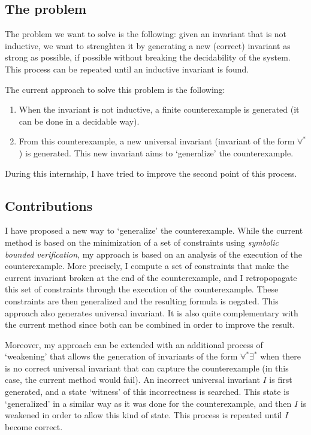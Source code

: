 \documentclass{article}
\newenvironment{point}[1]%
{\subsection*{#1}}%
{}
\begin{document}
\begin{point}{The problem}
  
  The problem we want to solve is the following:
  given an invariant that is not inductive, we want to strenghten it by generating a new (correct) invariant as strong as possible,
  if possible without breaking the decidability of the system.
  This process can be repeated until an inductive invariant is found.

  The current approach to solve this problem is the following:
  \begin{enumerate}
    \item When the invariant is not inductive, a finite counterexample is generated (it can be done in a decidable way).
    \item From this counterexample, a new universal invariant (invariant of the form \(\forall^*\)) is generated. This new invariant aims to `generalize' the counterexample.
  \end{enumerate}
  
  During this internship, I have tried to improve the second point of this process.

\end{point}

\begin{point}{Contributions}

  I have proposed a new way to `generalize' the counterexample. While the current method is based on the
  minimization of a set of constraints using \textit{symbolic bounded verification},
  my approach is based on an analysis of the execution of the counterexample.
  More precisely, I compute a set of constraints that make the current invariant broken at the end of the counterexample,
  and I retropopagate this set of constraints through the execution of the counterexample.
  These constraints are then generalized and the resulting formula is negated.
  This approach also generates universal invariant. It is also quite complementary with the current method
  since both can be combined in order to improve the result.

  Moreover, my approach can be extended with an additional process of `weakening' that
  allows the generation of invariants of the form \(\forall^*\exists^*\) when there is no
  correct universal invariant that can capture the counterexample (in this case, the current method would fail).
  An incorrect universal invariant \(I\) is first generated, and a state `witness' of this incorrectness is searched.
  This state is `generalized' in a similar way as it was done for the counterexample, and then \(I\)
  is weakened in order to allow this kind of state. This process is repeated until \(I\) become correct.
 
\end{point}
\end{document}
